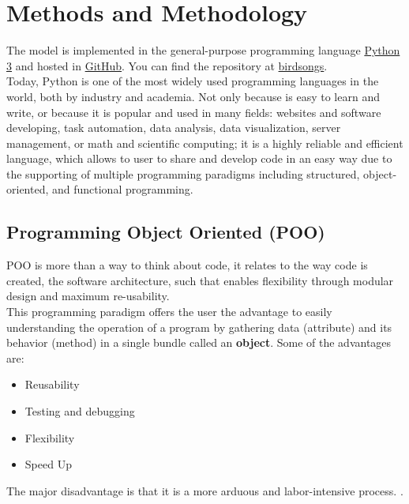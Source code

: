 \chapter{Methods and Methodology}\label{chap_methodology}

The model is implemented in the general-purpose programming language \href{https://www.python.org/}{Python 3} and hosted in \href{https://github.com/}{GitHub}. You can find the repository at \href{https://saguileran.github.io/birdsongs/}{birdsongs}.\\

Today, Python is one of the most widely used programming languages in the world, both by industry and academia. Not only because is easy to learn and write, or because it is popular and used in many fields: websites and software developing, task automation, data analysis, data visualization, server management, or math and scientific computing; it is a highly reliable and efficient language, which allows to user to share and develop code in an easy way due to the supporting of multiple programming paradigms including structured, object-oriented, and functional programming.


\section{Programming Object Oriented (POO)}

POO is more than a way to think about code, it relates to the way  code is created, the software architecture, such that enables flexibility through modular design and maximum re-usability. \cite{poo} \\

This programming paradigm offers the user the advantage to easily understanding the operation of a program by gathering data (attribute) and its behavior (method) in a single bundle called an \textbf{object}. Some of the advantages are:

\begin{itemize}
    \item Reusability
    \item Testing and debugging
    \item Flexibility
    \item Speed Up
    
\end{itemize}

The major disadvantage is that it is a more arduous and labor-intensive process. \cite{poo_coursera}.

